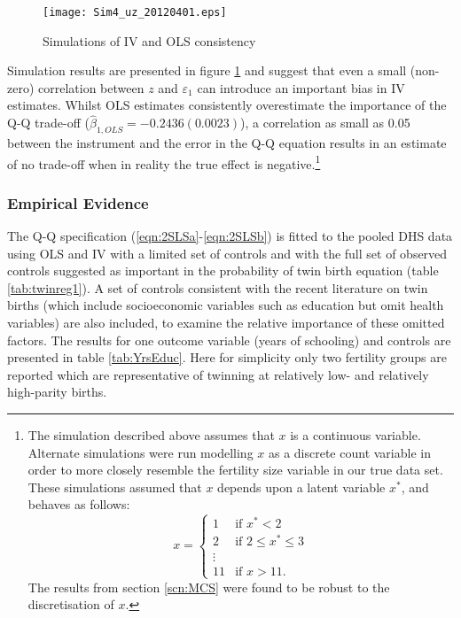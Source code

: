 \documentclass{article}[11pt,subeqn]
\begin{document}
\begin{spacing}{1.5}
\begin{figure}[!htbp]
\caption{Simulations of IV and OLS consistency}
\label{fig:MC}
\begin{center}
\vspace{-4mm}
\texttt{[image: Sim4\_uz\_20120401.eps]}
\end{center}
\end{figure}


Simulation results are presented in figure \ref{fig:MC} and suggest that even a small (non-zero) correlation between $z$ and $\varepsilon_1$ can introduce an 
important bias in IV estimates.  Whilst OLS estimates consistently overestimate the importance of the Q-Q trade-off ($\hat{\beta}_{1,OLS}=-0.2436 (0.0023)$), a correlation
as small as 0.05 between the instrument and the error in the Q-Q equation results in an estimate of no trade-off when in reality the true effect is negative.\footnote{The
simulation described above assumes that $x$ is a continuous variable.  Alternate simulations were run modelling $x$ as a discrete count variable in order to more closely resemble 
the fertility size variable in our true data set.  These simulations assumed that $x$ depends upon a latent variable $x^*$, and behaves as follows:
\[ x = \left\{ \begin{array}{ll}
         1 & \mbox{if $x^* < 2$}\\
         2 & \mbox{if $2\leq x^* \leq 3$}\\
        \vdots & \\
        11 & \mbox{if $x > 11$}.\end{array} \right. \]
 The results from section \ref{scn:MCS} were found to be robust to the discretisation of $x$.
}
\subsubsection{Empirical Evidence}
\label{scn:EE}
The Q-Q specification (\ref{eqn:2SLSa}-\ref{eqn:2SLSb}) is fitted to the pooled DHS data using OLS and IV with a limited set of controls and with the full set of observed 
controls suggested as important in the probability of twin birth equation (table \ref{tab:twinreg1}).  A set of controls consistent with the recent literature on twin births (which 
include socioeconomic variables such as education but omit health variables) are also included, to examine the relative importance of these omitted factors.  The results for one 
outcome variable (years of schooling) and controls are presented in table \ref{tab:YrsEduc}.  Here for simplicity only two fertility groups are reported which are representative
of twinning at relatively low- and relatively high-parity births.



\end{spacing}
\end{document}
